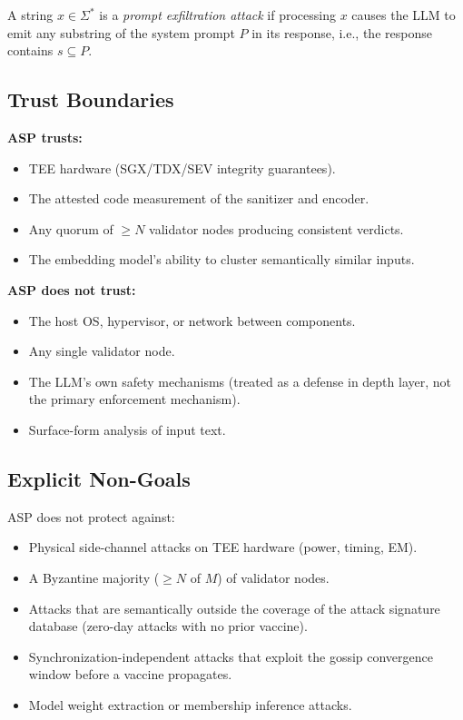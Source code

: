 \documentclass[sigconf,natbib=false]{acmart}
\begin{document}
\begin{definition}
A string $x \in \Sigma^*$ is a \emph{prompt exfiltration attack} if
processing $x$ causes the LLM to emit any substring of the system prompt
$P$ in its response, i.e., the response contains $s \subseteq P$.
\end{definition}

\subsection{Trust Boundaries}
\label{sec:threat:trust}

\textbf{ASP trusts:}
\begin{itemize}
  \item TEE hardware (SGX/TDX/SEV integrity guarantees).
  \item The attested code measurement of the sanitizer and encoder.
  \item Any quorum of $\geq N$ validator nodes producing consistent verdicts.
  \item The embedding model's ability to cluster semantically similar inputs.
\end{itemize}

\textbf{ASP does not trust:}
\begin{itemize}
  \item The host OS, hypervisor, or network between components.
  \item Any single validator node.
  \item The LLM's own safety mechanisms (treated as a defense in depth layer,
    not the primary enforcement mechanism).
  \item Surface-form analysis of input text.
\end{itemize}

\subsection{Explicit Non-Goals}
\label{sec:threat:nongaols}

ASP does not protect against:
\begin{itemize}
  \item Physical side-channel attacks on TEE hardware (power, timing, EM).
  \item A Byzantine majority ($\geq N$ of $M$) of validator nodes.
  \item Attacks that are semantically outside the coverage of the attack
    signature database (zero-day attacks with no prior vaccine).
  \item Synchronization-independent attacks that exploit the gossip
    convergence window before a vaccine propagates.
  \item Model weight extraction or membership inference attacks.
\end{itemize}
\end{document}
